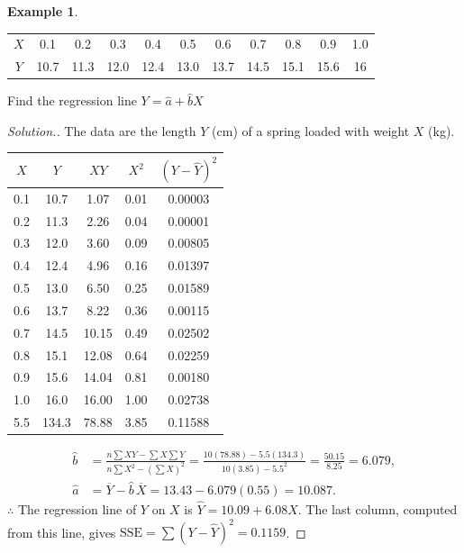 \documentclass[11pt,a4paper]{article}
\theoremstyle{definition}
\newtheorem{example}[thm]{Example}
\newenvironment{solution}
  {\renewcommand{\qedsymbol}{}\begin{proof}[\textit{Solution}.]}
  {\end{proof}}
\begin{document}
\begin{example}
\begin{table}[H]
\begin{tabular}{c|cccccccccc}
$X$&0.1&0.2&0.3&0.4&0.5&0.6&0.7&0.8&0.9&1.0\\ $Y$&10.7&11.3&12.0&12.4&13.0&13.7&14.5&15.1&15.6&16\\
\end{tabular}
\end{table}

Find the regression line $Y=\hat{a}+\hat{b}X$\\[1ex]
\end{example}


\begin{solution}
The data are the length $Y$ (cm) of a spring loaded with weight $X$ (kg).
\begin{table}[H]
\centering
\begin{tabular}{|c|c|c|c|c|}
\hline $X$&$Y$&$XY$&$X^2$&$(Y-\hat{Y})^2$\\
\hline
0.1 & 10.7 & 1.07 & 0.01 & 0.00003\\
0.2 & 11.3 & 2.26 & 0.04 & 0.00001\\
0.3 & 12.0 & 3.60 & 0.09 & 0.00805\\
0.4 & 12.4 & 4.96 & 0.16 & 0.01397\\
0.5 & 13.0 & 6.50 & 0.25 & 0.01589\\
0.6 & 13.7 & 8.22 & 0.36 & 0.00115\\
0.7 & 14.5 & 10.15 & 0.49 & 0.02502\\
0.8 & 15.1 & 12.08 & 0.64 & 0.02259\\
0.9 & 15.6 & 14.04 & 0.81 & 0.00180\\
1.0 & 16.0 & 16.00 & 1.00 & 0.02738\\
\hline 5.5 &134.3&78.88&3.85&0.11588\\
\hline
\end{tabular}
\end{table}
\begin{align*}
\hat{b} &=\frac{n\sum XY-\sum X\sum Y}{n\sum X^2-\left(\sum X\right)^2}=\frac{10(78.88)-5.5(134.3)}{10(3.85)-5.5^2}=\frac{50.15}{8.25}=6.079,\\
\hat{a} &=\overline{Y}-\hat{b}\,\overline{X}=13.43-6.079(0.55)=10.087 .
\end{align*}
$\therefore$ The regression line of $Y$ on $X$ is $\hat Y=10.09+6.08X$. The last column, computed from
this line, gives $\text{SSE} = \sum(Y - \hat Y)^2 = 0.1159$.
\end{solution}
\end{document}
